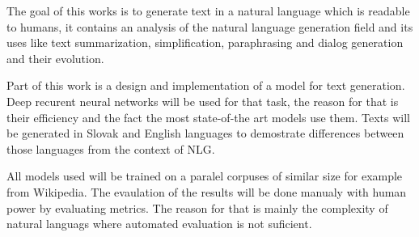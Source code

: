The goal of this works is to generate text in a natural language which is readable to humans, it contains an analysis of the natural language generation field and its uses like text summarization, simplification, paraphrasing and dialog generation and their evolution.

Part of this work is a design and implementation of a model for text generation. Deep recurent neural networks will be used for that task, the reason for that is their efficiency and the fact the most state-of-the art models use them. Texts will be generated in Slovak and English languages to demostrate differences between those languages from the context of NLG.

All models used will be trained on a paralel corpuses of similar size for example from Wikipedia. The evaulation of the results will be done manualy with human power by evaluating metrics. The reason for that is mainly the complexity of natural languags where automated evaluation is not suficient.

\newpage
\blankpage